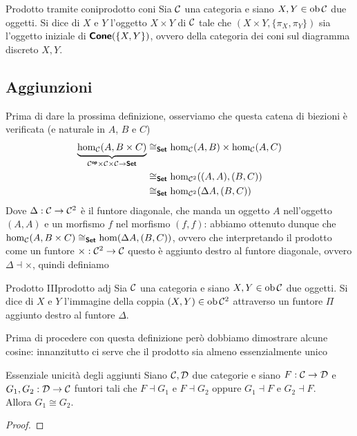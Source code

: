 \documentclass{article}
\renewcommand\C{\mc{C}}
\newcommand\D{\mc{D}}
\begin{document}
\begin{definition}{Prodotto tramite coni}{prodotto coni}
    Sia $\C$ una categoria e siano $X,Y \in \ob\C$ due oggetti.
    Si dice  di $X$ e $Y$ l'oggetto $X\times Y$ di $\C$ tale che $(X\times Y, \{\pi_X, \pi_Y\})$ sia l'oggetto iniziale di $\text{\sffamily\textbf{Cone}}(\{X,Y\})$, ovvero della categoria dei coni sul diagramma discreto ${X,Y}$.
\end{definition}

\subsection{Aggiunzioni}

Prima di dare la prossima definizione, osserviamo che questa catena di biezioni è verificata (e naturale in $A$, $B$ e $C$)
\[\begin{aligned}
    \underbrace{\hom_\C(A, B\times C)}_{\C^\op \times \C\times\C \to \setcat} & \cong_\setcat \hom_\C(A,B)\times \hom_\C(A,C)\\
    & \cong_\setcat \hom_{\C^2}((A,A),(B,C))\\
    & \cong_\setcat \hom_{\C^2}(\Delta A,(B,C))
\end{aligned}\]
Dove $\Delta:\C\to\C^2$ è il funtore diagonale, che manda un oggetto $A$ nell'oggetto $(A,A)$ e un morfismo $f$ nel morfismo $(f,f)$: abbiamo ottenuto dunque che $\hom_\C(A, B\times C) \cong_\setcat \hom(\Delta A, (B,C))$, ovvero che interpretando il prodotto come un funtore $\times: \C^2\to\C$ questo è aggiunto destro al funtore diagonale, ovvero $\Delta \dashv \times$, quindi definiamo

\begin{definition}{Prodotto III}{prodotto adj}
    Sia $\C$ una categoria e siano $X,Y \in \ob\C$ due oggetti. 
    Si dice  di $X$ e $Y$ l'immagine della coppia $(X,Y) \in \ob\C^2$ attraverso un funtore $\Pi$ aggiunto destro al funtore $\Delta$.
\end{definition}

Prima di procedere con questa definizione però dobbiamo dimostrare alcune cosine: innanzitutto ci serve che il prodotto sia almeno essenzialmente unico
\begin{lemma}{Essenziale unicità degli aggiunti}{}
    Siano $\C,\D$ due categorie e siano $F:\C\to\D$ e $G_1,G_2: \D\to\C$ funtori tali che $F\dashv G_1$ e $F\dashv G_2$ oppure $G_1\dashv F$ e $G_2\dashv F$.\\
    Allora $G_1\cong G_2$.
    \begin{proof}
        
    \end{proof}
\end{lemma}
\end{document}
